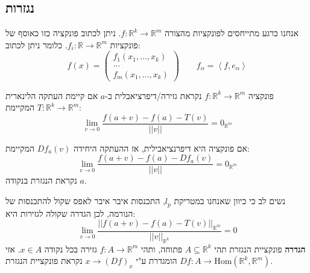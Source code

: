 \documentclass{tstextbook}
\begin{document}
\subsection{נגזרות}

אנחנו כרגע מתייחסים לפונקציות מהצורה \(f:\mathbb{R}^k\to\mathbb{R}^m\). ניתן לכתוב פונקציה כזו כאוסף של פונקציות \(f_{i}:\mathbb{R}\to\mathbb{R}^m\). כלומר ניתן לכתוב:
$$f(x)=\begin{pmatrix}{{f_{1}\left(x_{1},\ldots,x_{k}\right)}}\\ {{\ldots}}\\ {{f_{m}\!\left(x_{1},\ldots,x_{k}\right)}}
\end{pmatrix} \qquad  f_{\alpha}=\left\langle f,e_{\alpha}\right\rangle$$

\begin{definition}[דיפרנציאבליות]
פונקציה \(f:\mathbb{R}^k\to\mathbb{R}^m\) נקראת גזירה/דיפרציאבלית ב-\(a\) אם קיימת העתקה הלינארית \(T:\mathbb{R}^k\to\mathbb{R}^m\) המקיימת:
$$\operatorname*{lim}_{v\to0}{\frac{f(a+v)-f(a)-T(v)}{||v||}}=0_{\mathbb{R}^m}$$

\end{definition}
\begin{definition}
אם פונקציה היא דיפרנציאבילית, אז ההעתקה היחידה \(Df_{a}(v)\) המקיימת:
$$\operatorname*{lim}_{v\to0}{\frac{f(a+v)-f(a)-Df_{a}(v)}{||v||}}=0_{\mathbb{R}^m}$$
נקראת הנגזרת בנקודה \(a\). 

\end{definition}
נשים לב כי כיוון שאנחנו במטריקת \(l_{p}\), התכנסות איבר איבר לאפס שקול להתכנסות של הנורמה, לכן הגדרה שקולה לגזירות היא:
$$\lim_{ v \to 0 } \frac{||f(a+v)-f(a)-T(v)||_{\mathbb{R}^m}}{||v||_{\mathbb{R}^k}}=0$$\textbf{הגדרה} פונקציית הנגזרת
תהי \(A\subseteq \mathbb{R}^k\) פתוחה, ותהי \(f:A\to\mathbb{R}^m\) גזירה בכל נקודה \(x \in A\). אזי \(Df:A\to \mathrm{Hom}\left( \mathbb{R}^k,\mathbb{R}^m \right)\) הומגדרת ע"י \(x\to (Df)_{x}\) נקראת פונקציית הנגזרת.
\end{document}
